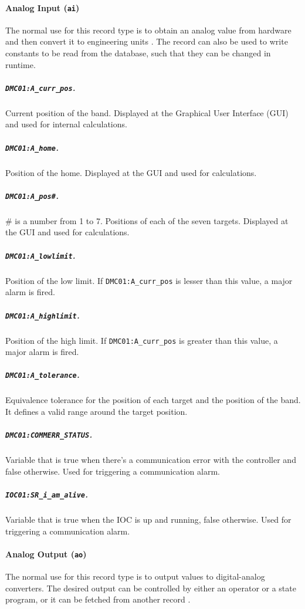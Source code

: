 \paragraph{Analog Input (\texttt{ai})}
    The normal use for this record type is to obtain an analog value from hardware and then convert it to engineering units \cite{stanley1998}.
    The record can also be used to write constants to be read from the database, such that they can be changed in runtime.

    \subparagraph{\texttt{DMC01:A\_curr\_pos}.}
        Current position of the band.
        Displayed at the Graphical User Interface (GUI) and used for internal calculations.

    \subparagraph{\texttt{DMC01:A\_home}.}
        Position of the home.
        Displayed at the GUI and used for calculations.

    \subparagraph{\texttt{DMC01:A\_pos\#}.}
        \# is a number from 1 to 7.
        Positions of each of the seven targets.
        Displayed at the GUI and used for calculations.

    \subparagraph{\texttt{DMC01:A\_lowlimit}.}
        Position of the low limit.
        If \texttt{DMC01:A\_curr\_pos} is lesser than this value, a major alarm is fired.

    \subparagraph{\texttt{DMC01:A\_highlimit}.}
        Position of the high limit.
        If \texttt{DMC01:A\_curr\_pos} is greater than this value, a major alarm is fired.

    \subparagraph{\texttt{DMC01:A\_tolerance}.}
        Equivalence tolerance for the position of each target and the position of the band.
        It defines a valid range around the target position.

    \subparagraph{\texttt{DMC01:COMMERR\_STATUS}.}
        Variable that is true when there's a communication error with the controller and false otherwise.
        Used for triggering a communication alarm.

    \subparagraph{\texttt{IOC01:SR\_i\_am\_alive}.}
        Variable that is true when the IOC is up and running, false otherwise.
        Used for triggering a communication alarm.

\paragraph{Analog Output (\texttt{ao})}
    The normal use for this record type is to output values to digital-analog converters.
    The desired output can be controlled by either an operator or a state program, or it can be fetched from another record \cite{stanley1998}.


